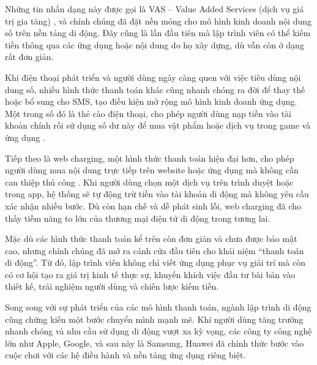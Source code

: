 \begin{flushleft}
\hspace*{0.8cm}Những tin nhắn dạng này được gọi là VAS – Value Added Services (dịch vụ giá trị gia tăng) \cite{vas-overview}, và chính chúng đã đặt nền móng cho mô hình kinh doanh nội dung số trên nền tảng di động. Đây cũng là lần đầu tiên mà lập trình viên có thể kiếm tiền thông qua các ứng dụng hoặc nội dung do họ xây dựng, dù vẫn còn ở dạng rất đơn giản.
\end{flushleft}

\begin{flushleft}
\hspace*{0.8cm}Khi điện thoại phát triển và người dùng ngày càng quen với việc tiêu dùng nội dung số, nhiều hình thức thanh toán khác cũng nhanh chóng ra đời để thay thế hoặc bổ sung cho SMS, tạo điều kiện mở rộng mô hình kinh doanh ứng dụng. Một trong số đó là thẻ cào điện thoại, cho phép người dùng nạp tiền vào tài khoản chính rồi sử dụng số dư này để mua vật phẩm hoặc dịch vụ trong game và ứng dụng \cite{prepaid-topup}.
\end{flushleft}

\begin{flushleft}
\hspace*{0.8cm}Tiếp theo là web charging, một hình thức thanh toán hiện đại hơn, cho phép người dùng mua nội dung trực tiếp trên website hoặc ứng dụng mà không cần can thiệp thủ công \cite{web-charging}. Khi người dùng chọn một dịch vụ trên trình duyệt hoặc trong app, hệ thống sẽ tự động trừ tiền vào tài khoản di động mà không yêu cầu xác nhận nhiều bước. Dù còn hạn chế và dễ phát sinh lỗi, web charging đã cho thấy tiềm năng to lớn của thương mại điện tử di động trong tương lai.
\end{flushleft}

\begin{flushleft}
\hspace*{0.8cm}Mặc dù các hình thức thanh toán kể trên còn đơn giản và chưa được bảo mật cao, nhưng chính chúng đã mở ra cánh cửa đầu tiên cho khái niệm “thanh toán di động”. Từ đó, lập trình viên không chỉ viết ứng dụng phục vụ giải trí mà còn có cơ hội tạo ra giá trị kinh tế thực sự, khuyến khích việc đầu tư bài bản vào thiết kế, trải nghiệm người dùng và chiến lược kiếm tiền.
\end{flushleft}

\begin{flushleft}
\hspace*{0.8cm}Song song với sự phát triển của các mô hình thanh toán, ngành lập trình di động cũng chứng kiến một bước chuyển mình mạnh mẽ. Khi người dùng tăng trưởng nhanh chóng và nhu cầu sử dụng di động vượt xa kỳ vọng, các công ty công nghệ lớn như Apple, Google, và sau này là Samsung, Huawei đã chính thức bước vào cuộc chơi với các hệ điều hành và nền tảng ứng dụng riêng biệt.
\end{flushleft}

